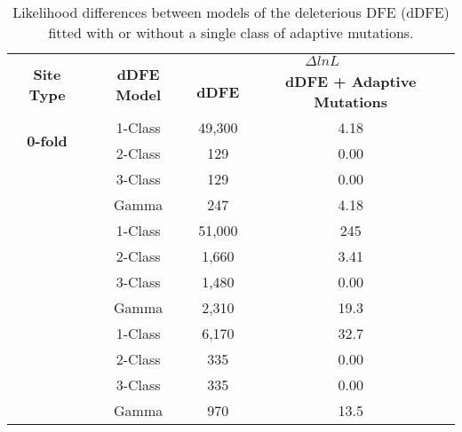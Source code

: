 \begin{table}[h!]
\centering
\caption[Likelihood differences between models of the dDFE fitted with or without a single class of adaptive mutations]{Likelihood differences between models of the deleterious DFE (dDFE) fitted with or without a single class of adaptive mutations.}
 \begin{tabular}{c c c c } 

\toprule
\multirow{2}{*}{\textbf{Site Type}} 	& \multirow{2}{*}{\textbf{dDFE Model}}& 	\multicolumn{2}{c}{\textbf{$\Delta lnL$}} \\
    &  &   \textbf{dDFE}	 & \textbf{dDFE + Adaptive Mutations} \\ \hline
\multirow{2}{*}{\textbf{0-fold}} &	1-Class	&49,300	&4.18 \\
	   &2-Class	&129 	&0.00 \\
	   &3-Class	&129	    &0.00 \\
	   &Gamma	&247	 	&4.18 \\ \hdashline
\multirow{2}{*}{\textbf{CNE}}	   &1-Class	&51,000	&245 \\
	   &2-Class	&1,660	&3.41 \\
	   &3-Class	&1,480	&0.00 \\
	   &Gamma	&2,310	&19.3 \\ \hdashline
\multirow{2}{*}{\textbf{UTR}}	   &1-Class	&6,170	&32.7 \\
	   &2-Class	&335	    &0.00 \\
	   &3-Class	&335	    &0.00 \\
	   &Gamma	&970	    &13.5 \\
\bottomrule

\end{tabular}
\label{tab:CS4}
\end{table}